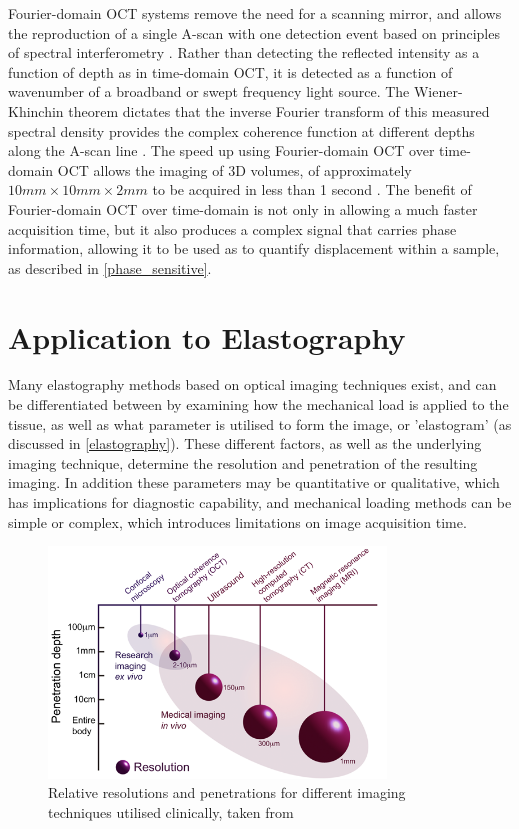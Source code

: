 Fourier-domain OCT systems remove the need for a scanning mirror, and allows the reproduction of a single A-scan with one detection event based on principles of spectral interferometry \cite{chin_parametric_2016}. Rather than detecting the reflected intensity as a function of depth as in time-domain OCT, it is detected as a function of wavenumber of a broadband or swept frequency light source. The Wiener-Khinchin theorem dictates that the inverse Fourier transform of this measured spectral density provides the complex coherence function at different depths along the A-scan line \cite{schmitt_optical_1999}. The speed up using Fourier-domain OCT over time-domain OCT allows the imaging of 3D volumes, of approximately $10mm \times 10mm \times 2mm$ to be acquired in less than 1 second \cite{kennedy_emergence_2017}. The benefit of Fourier-domain OCT over time-domain is not only in allowing a much faster acquisition time, but it also produces a complex signal that carries phase information, allowing it to be used as to quantify displacement within a sample, as described in \autoref{phase_sensitive}.

\section{Application to Elastography}\label{application_elastography}

Many elastography methods based on optical imaging techniques exist, and can be differentiated between by examining how the mechanical load is applied to the tissue, as well as what parameter is utilised to form the image, or 'elastogram' (as discussed in \autoref{elastography}). These different factors, as well as the underlying imaging technique, determine the resolution and penetration of the resulting imaging. In addition these parameters may be quantitative or qualitative, which has implications for diagnostic capability, and mechanical loading methods can be simple or complex, which introduces limitations on image acquisition time.

\begin{figure}[t]
	\centering
    \includegraphics[width=0.8\textwidth]{figures/technique_comparison.png}
    \caption{Relative resolutions and penetrations for different imaging techniques utilised clinically, taken from \cite{optical+biomedical_engineering_laboratory_introduction_nodate}}
    \label{image_techniques}	
\end{figure}

